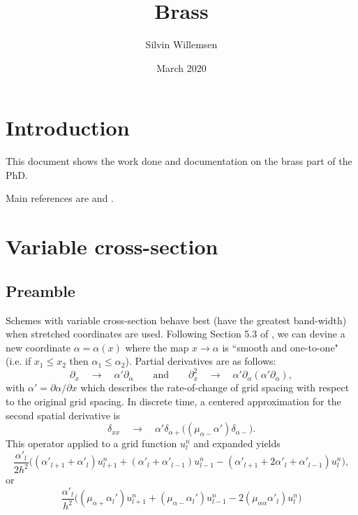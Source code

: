 \documentclass[dvipsnames]{article}
\title{Brass}
\author{Silvin Willemsen}
\date{March 2020}
\begin{document}
\maketitle

\section{Introduction}
This document shows the work done and documentation on the brass part of the PhD.

Main references are \cite{Bilbao2009} and \cite{Bilbao2018}.

\section{Variable cross-section}
\subsection{Preamble}
Schemes with variable cross-section behave best (have the greatest band-width) when stretched coordinates are used. Following Section 5.3 of \cite{Bilbao2009}, we can devine a new coordinate $\alpha = \alpha(x)$ where the map $x\rightarrow\alpha$ is ``smooth and one-to-one" (i.e. if $x_1\leq x_2$ then $\alpha_1\leq \alpha_2$). Partial derivatives are as follows:
\begin{equation}
   \partial_x \quad\longrightarrow\quad \alpha'\partial_\alpha \qquad \text{and} \qquad \partial_x^2\quad \longrightarrow\quad\alpha'\partial_\alpha\left(\alpha'\partial_\alpha\right),
\end{equation}
with $\alpha'= \partial \alpha/\partial x$ which describes the rate-of-change of grid spacing with respect to the original grid spacing. In discrete time, a centered approximation for the second spatial derivative is
\begin{equation}\label{eq:secondOrderVarying}
    \delta_{xx} \quad \longrightarrow \quad \alpha'\delta_{\alpha+}\big((\mu_{\alpha-}\alpha')\delta_{\alpha-}\big).
\end{equation}
This operator applied to a grid function $u_l^n$ and expanded yields
\begin{equation}
    \frac{\alpha'_l}{2h^2} \Big((\alpha'_{l+1}+\alpha'_l)u_{l+1}^n + (\alpha'_l+\alpha'_{l-1})u_{l-1}^n - (\alpha'_{l+1}+2\alpha'_l+\alpha'_{l-1})u_l^n\Big),
\end{equation}
or
\begin{equation}
    \frac{\alpha'_l}{h^2}\Big((\mu_{\alpha+}\alpha_l')u_{l+1}^n+(\mu_{\alpha-}\alpha_l')u_{l-1}^n-2(\mu_{\alpha\alpha}\alpha'_l)u_l^n\Big)
\end{equation}
\end{document}
